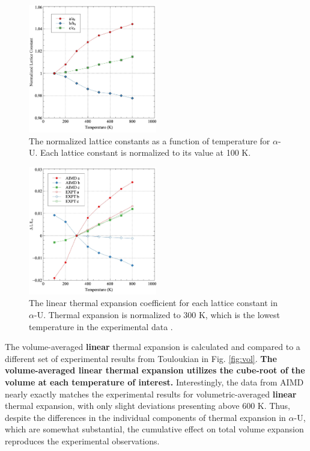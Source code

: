 \documentclass[utf8]{frontiersSCNS} %
\providecommand{\DIFaddtex}[1]{{\bf #1}} %
\providecommand{\DIFdeltex}[1]{} %
\providecommand{\DIFaddbegin}{\protect\color{blue}} %
\providecommand{\DIFaddend}{\protect\color{black}} %
\providecommand{\DIFaddFL}[1]{\DIFadd{#1}} %
\providecommand{\DIFdelFL}[1]{\DIFdel{#1}} %
\providecommand{\DIFaddbeginFL}{} %
\providecommand{\DIFaddendFL}{} %
\providecommand{\DIFdelbeginFL}{} %
\providecommand{\DIFdelendFL}{} %
\providecommand{\DIFadd}[1]{\texorpdfstring{\DIFaddtex{#1}}{#1}} %
\providecommand{\DIFdel}[1]{\texorpdfstring{\DIFdeltex{#1}}{}} %
\begin{document}
 \begin{figure}[hbt]
	\centering
	\DIFdelbeginFL %
\DIFdelendFL \DIFaddbeginFL \includegraphics[width=0.5\textwidth]{a0_norm.jpg}
  \DIFaddendFL \caption{The normalized lattice constants as a function of temperature for $\alpha$-U. Each lattice constant is normalized to its value at 100 K.}\label{fig:a0}
\end{figure}

 \begin{figure}[hbt]
	\centering
	\DIFdelbeginFL %
\DIFdelendFL \DIFaddbeginFL \includegraphics[width=0.5\textwidth]{lte.jpg}
  \DIFaddendFL \caption{The linear thermal expansion coefficient for each lattice constant in $\alpha$-U. Thermal expansion is normalized to 300 K, which is the lowest temperature in the experimental data \DIFdelbeginFL \DIFdelFL{\cite{grenthe2010, lloyd1966}}\DIFdelendFL \DIFaddbeginFL \DIFaddFL{\cite{touloukian}}\DIFaddendFL . }\label{fig:exp}
\end{figure}

\FloatBarrier

The volume-averaged \DIFaddbegin \DIFadd{linear }\DIFaddend thermal expansion is calculated and compared to a different set of experimental results from Touloukian \cite{touloukian} in Fig. \ref{fig:vol}. \DIFaddbegin \DIFadd{The volume-averaged linear thermal expansion utilizes the cube-root of the volume at each temperature of interest. }\DIFaddend Interestingly, the data from AIMD nearly exactly matches the experimental results for volumetric-averaged \DIFaddbegin \DIFadd{linear }\DIFaddend thermal expansion, with only slight deviations presenting above 600 K. Thus, despite the differences in the individual components of thermal expansion in $\alpha$-U, which are somewhat substantial, the cumulative effect on total volume expansion reproduces the experimental observations. 
\end{document}
